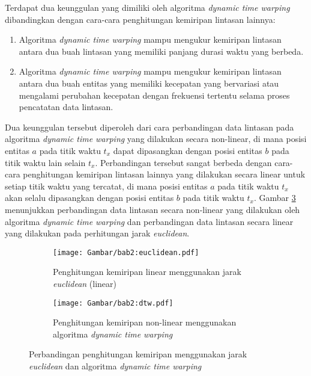 Terdapat dua keunggulan yang dimiliki oleh algoritma \textit{dynamic time warping} dibandingkan dengan cara-cara penghitungan kemiripan lintasan lainnya:

\begin{enumerate}
    \item Algoritma \textit{dynamic time warping} mampu mengukur kemiripan lintasan antara dua buah lintasan yang memiliki panjang durasi waktu yang berbeda.
    \item Algoritma \textit{dynamic time warping} mampu mengukur kemiripan lintasan antara dua buah entitas yang memiliki kecepatan yang bervariasi atau mengalami perubahan kecepatan dengan frekuensi tertentu selama proses pencatatan data lintasan.
\end{enumerate}

Dua keunggulan tersebut diperoleh dari cara perbandingan data lintasan pada algoritma \textit{dynamic time warping} yang dilakukan secara non-linear, di mana posisi entitas $a$ pada titik waktu $t_x$ dapat dipasangkan dengan posisi entitas $b$ pada titik waktu lain selain $t_x$. Perbandingan tersebut sangat berbeda dengan cara-cara penghitungan kemiripan lintasan lainnya yang dilakukan secara linear untuk setiap titik waktu yang tercatat, di mana posisi entitas $a$ pada titik waktu $t_x$ akan selalu dipasangkan dengan posisi entitas $b$ pada titik waktu $t_x$. Gambar \ref{bab2:dtw-euclidean} menunjukkan perbandingan data lintasan secara non-linear yang dilakukan oleh algoritma \textit{dynamic time warping} dan perbandingan data lintasan secara linear yang dilakukan pada perhitungan jarak \textit{euclidean}.

\begin{figure}[t]
    \centering
    \begin{subfigure}[h]{0.45\textwidth}
        \centering
        \texttt{[image: Gambar/bab2:euclidean.pdf]}
        \caption{Penghitungan kemiripan linear menggunakan jarak \textit{euclidean} (linear)}
        \label{bab2:euclidean}
    \end{subfigure} \hspace{1cm}
    \begin{subfigure}[h]{0.45\textwidth}
        \centering
        \texttt{[image: Gambar/bab2:dtw.pdf]}
        \caption{Penghitungan kemiripan non-linear menggunakan algoritma \textit{dynamic time warping}}
        \label{bab2:dtw}
    \end{subfigure}
    \caption{Perbandingan penghitungan kemiripan menggunakan jarak \textit{euclidean} dan algoritma \textit{dynamic time warping}}
    \label{bab2:dtw-euclidean}
\end{figure}

